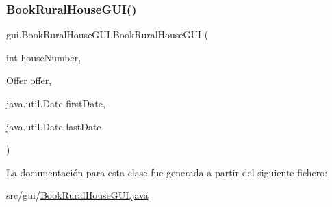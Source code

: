 \subsubsection{\texorpdfstring{BookRuralHouseGUI()}{BookRuralHouseGUI()}\hspace{0.1cm}{\footnotesize\ttfamily [2/2]}}
{\footnotesize\ttfamily gui.\+Book\+Rural\+House\+G\+U\+I.\+Book\+Rural\+House\+G\+UI (\begin{DoxyParamCaption}\item[{int}]{house\+Number,  }\item[{\mbox{\hyperlink{classdomain_1_1_offer}{Offer}}}]{offer,  }\item[{java.\+util.\+Date}]{first\+Date,  }\item[{java.\+util.\+Date}]{last\+Date }\end{DoxyParamCaption})}



La documentación para esta clase fue generada a partir del siguiente fichero\+:\begin{DoxyCompactItemize}
\item 
src/gui/\mbox{\hyperlink{_book_rural_house_g_u_i_8java}{Book\+Rural\+House\+G\+U\+I.\+java}}\end{DoxyCompactItemize}
